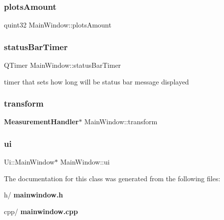 \subsubsection{plots\+Amount}
{\footnotesize\ttfamily quint32 Main\+Window\+::plots\+Amount\hspace{0.3cm}{\ttfamily [private]}}

\mbox{\label{class_main_window_af66c315b651ade2e54045edb68c51c86}} 
\subsubsection{status\+Bar\+Timer}
{\footnotesize\ttfamily Q\+Timer Main\+Window\+::status\+Bar\+Timer\hspace{0.3cm}{\ttfamily [private]}}

timer that sets how long will be status bar message displayed \mbox{\label{class_main_window_a6a921ce08975d864ff158f36760802a8}} 
\subsubsection{transform}
{\footnotesize\ttfamily \textbf{ Measurement\+Handler}$\ast$ Main\+Window\+::transform\hspace{0.3cm}{\ttfamily [private]}}

\mbox{\label{class_main_window_a35466a70ed47252a0191168126a352a5}} 
\subsubsection{ui}
{\footnotesize\ttfamily Ui\+::\+Main\+Window$\ast$ Main\+Window\+::ui\hspace{0.3cm}{\ttfamily [private]}}



The documentation for this class was generated from the following files\+:\begin{DoxyCompactItemize}
\item 
h/\textbf{ mainwindow.\+h}\item 
cpp/\textbf{ mainwindow.\+cpp}\end{DoxyCompactItemize}
